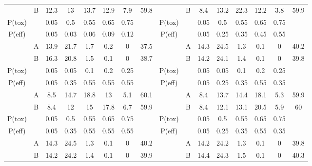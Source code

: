 \begin{table}
{\begin{tabular}[t]{ccccccc>{}c|cccccccc}
			\multirow{-2}{*}{\centering\arraybackslash 3} & B & 12.3 & 13 & 13.7 & 12.9 & 7.9 & 59.8 & \multirow{-2}{*}{\centering\arraybackslash 9} & B & 8.4 & 13.2 & 22.3 & 12.2 & 3.8 & 59.9\\
			\cmidrule{1-16}
			P(tox) &  & 0.05 & 0.5 & 0.55 & 0.65 & 0.75 &  & P(tox) &  & 0.05 & 0.5 & 0.55 & 0.65 & 0.75 \vphantom{1} & \\
			\cmidrule{1-16}
			P(eff) &  & 0.05 & 0.03 & 0.06 & 0.09 & 0.12 &  & P(eff) &  & 0.05 & 0.25 & 0.35 & 0.45 & 0.55 & \\
			\cmidrule{1-16}
			& A & 13.9 & 21.7 & 1.7 & 0.2 & 0 & 37.5 &  & A & 14.3 & 24.5 & 1.3 & 0.1 & 0 & 40.2\\
			
			\multirow{-2}{*}{\centering\arraybackslash 4} & B & 16.3 & 20.8 & 1.5 & 0.1 & 0 & 38.7 & \multirow{-2}{*}{\centering\arraybackslash 10} & B & 14.2 & 24.1 & 1.4 & 0.1 & 0 & 39.8\\
			\cmidrule{1-16}
			P(tox) &  & 0.05 & 0.05 & 0.1 & 0.2 & 0.25 &  & P(tox) &  & 0.05 & 0.05 & 0.1 & 0.2 & 0.25 & \\
			\cmidrule{1-16}
			P(eff) &  & 0.05 & 0.35 & 0.55 & 0.55 & 0.55 &  & P(eff) &  & 0.05 & 0.25 & 0.35 & 0.55 & 0.35 \vphantom{1} & \\
			\cmidrule{1-16}
			& A & 8.5 & 14.7 & 18.8 & 13 & 5.1 & 60.1 &  & A & 8.4 & 13.7 & 14.4 & 18.1 & 5.3 & 59.9\\
			
			\multirow{-2}{*}{\centering\arraybackslash 5} & B & 8.4 & 12 & 15 & 17.8 & 6.7 & 59.9 & \multirow{-2}{*}{\centering\arraybackslash 11} & B & 8.4 & 12.1 & 13.1 & 20.5 & 5.9 & 60\\
			\cmidrule{1-16}
			P(tox) &  & 0.05 & 0.5 & 0.55 & 0.65 & 0.75 &  & P(tox) &  & 0.05 & 0.5 & 0.55 & 0.65 & 0.75 & \\
			\cmidrule{1-16}
			P(eff) &  & 0.05 & 0.35 & 0.55 & 0.55 & 0.55 &  & P(eff) &  & 0.05 & 0.25 & 0.35 & 0.55 & 0.35 & \\
			\cmidrule{1-16}
			& A & 14.3 & 24.5 & 1.3 & 0.1 & 0 & 40.2 &  & A & 14.2 & 24.2 & 1.3 & 0.1 & 0 & 39.8\\
			
			\multirow{-2}{*}{\centering\arraybackslash 6} & B & 14.2 & 24.2 & 1.4 & 0.1 & 0 & 39.9 & \multirow{-2}{*}{\centering\arraybackslash 12} & B & 14.4 & 24.3 & 1.5 & 0.1 & 0 & 40.3\\
			\bottomrule
	\end{tabular}}
\end{table}
